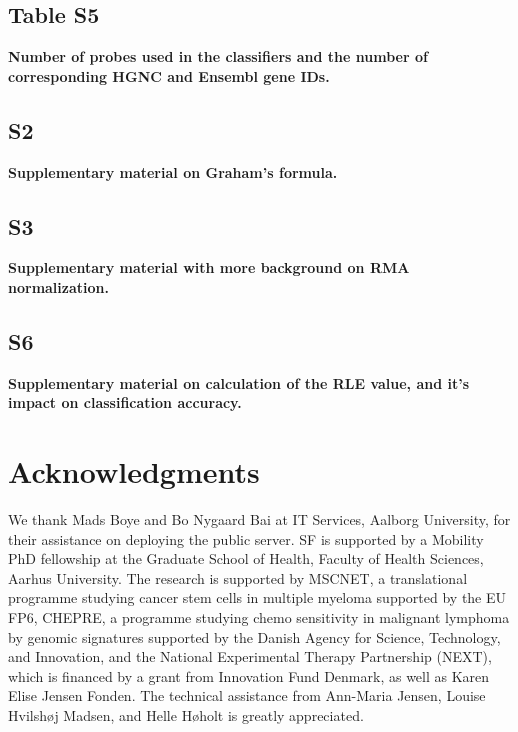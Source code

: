\documentclass[10pt,letterpaper]{article}
\begin{document}
\subsection*{Table S5}\label{probeTable}
\textbf{Number of probes used in the classifiers and the number of corresponding HGNC and Ensembl gene IDs.}

\subsection*{S2}\label{sec:graham}
{\bf Supplementary material on Graham's formula.}

\subsection*{S3} \label{supprma}
{\bf Supplementary material with more background on RMA normalization.}

\subsection*{S6} \label{sec:rle}
\label{sec:supp}
{\bf Supplementary material on calculation of the RLE value, and it's impact on classification accuracy.}


\section*{Acknowledgments}
We thank Mads Boye and Bo Nygaard Bai at IT Services, Aalborg University, for their assistance on deploying the public server.
SF is supported by a Mobility PhD fellowship at the Graduate School of Health, Faculty of Health Sciences, Aarhus University.
The research is supported by MSCNET, a translational programme studying cancer stem cells in multiple myeloma supported by the EU FP6, CHEPRE, a programme studying chemo sensitivity in malignant lymphoma by genomic signatures supported by the Danish Agency for Science, Technology, and Innovation, and the National Experimental Therapy Partnership (NEXT), which is financed by a grant from Innovation Fund Denmark, as well as Karen Elise Jensen Fonden.
The technical assistance from Ann-Maria Jensen, Louise Hvilsh{\o}j Madsen, and Helle H{\o}holt is greatly appreciated.
\end{document}
